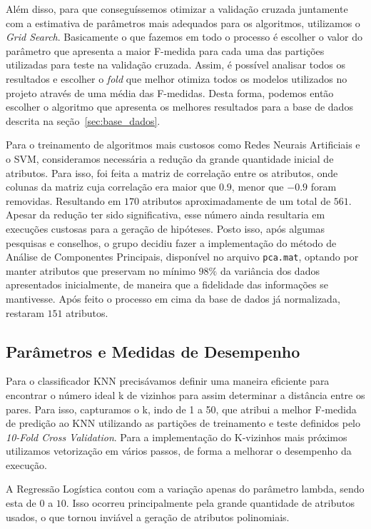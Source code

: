 \documentclass[10pt, conference, compsocconf]{IEEEtran}
\begin{document}
Além disso, para que conseguíssemos otimizar a validação cruzada juntamente 
com a estimativa de parâmetros mais adequados para os algoritmos, utilizamos 
o \textsl{Grid Search}. Basicamente o que fazemos em todo o processo é escolher 
o valor do parâmetro que apresenta a maior F-medida para cada uma das partições 
utilizadas para teste na validação cruzada. Assim, é possível analisar todos os
resultados e escolher o \textsl{fold} que melhor otimiza todos os modelos 
utilizados no projeto através de uma média das F-medidas. Desta forma, podemos
então escolher o algoritmo que apresenta os melhores resultados para a base de
dados descrita na seção~\ref{sec:base_dados}.

Para o treinamento de algoritmos mais custosos como Redes Neurais Artificiais 
e o SVM, consideramos necessária a redução da grande quantidade inicial de 
atributos. Para isso, foi feita a matriz de correlação entre os atributos, onde
colunas da matriz cuja correlação era maior que $0.9$, menor que $-0.9$ foram 
removidas. Resultando em $170$ atributos aproximadamente de um total de $561$. 
Apesar da redução ter sido significativa, esse número ainda resultaria em 
execuções custosas para a geração de hipóteses. Posto isso, após algumas 
pesquisas e conselhos, o grupo decidiu fazer a implementação do método de 
Análise de Componentes Principais, disponível no arquivo \texttt{pca.mat}, optando por manter atributos que preservam 
no mínimo $98\%$ da variância dos dados apresentados inicialmente, de maneira 
que a fidelidade das informações se mantivesse. Após feito o processo em cima 
da base de dados já normalizada, restaram $151$ atributos.


\subsection{Parâmetros e Medidas de Desempenho}
Para o classificador KNN precisávamos definir uma maneira eficiente para 
encontrar o número ideal k de vizinhos para assim determinar a distância entre 
os pares. Para isso, capturamos o k, indo de 1 a 50, que atribui a melhor 
F-medida de predição ao KNN utilizando as partições de treinamento e teste 
definidos pelo \textsl{10-Fold Cross Validation}. Para a implementação do 
K-vizinhos mais próximos utilizamos vetorização em vários passos, de forma a melhorar o desempenho da execução.

A Regressão Logística contou com a variação apenas do parâmetro lambda, sendo
esta de $0$ a $10$. Isso
ocorreu principalmente pela grande quantidade de atributos usados, o que tornou
inviável a geração de atributos polinomiais. 
\end{document}
